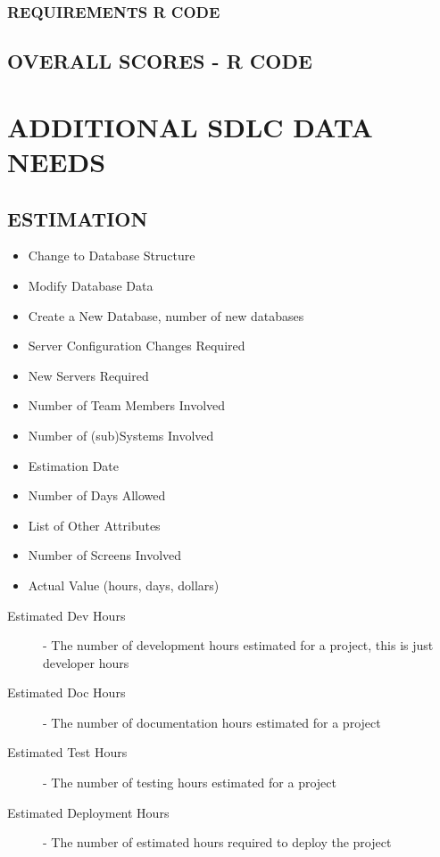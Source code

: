 \documentclass[SDSUThesis.tex]{subfiles}
\begin{document}
        \subsubsection{REQUIREMENTS R CODE}
        
        
        
    \subsection{OVERALL SCORES - R CODE}
        
        
    


\section{ADDITIONAL SDLC DATA NEEDS}

    \subsection{ESTIMATION}
    
    \begin{itemize}
    \item Change to Database Structure  
    \item Modify Database Data    
    \item Create a New Database, number of new databases  
    \item Server Configuration Changes Required   
    \item New Servers Required   
    \item Number of Team Members Involved  
    \item Number of (sub)Systems Involved  
    \item Estimation Date
    \item Number of Days Allowed
    \item List of Other Attributes
    \item Number of Screens Involved 
    \item Actual Value (hours, days, dollars) 
    \end{itemize}
    
    
    \begin{description}
        \item[Estimated Dev Hours] - 
            The number of development hours estimated for a 
            project, this is just developer hours
        \item[Estimated Doc Hours] - 
            The number of documentation hours estimated for a project
        \item[Estimated Test Hours] - 
            The number of testing hours estimated for a project
        \item[Estimated Deployment Hours] - 
            The number of estimated hours required to 
            deploy the project
    \end{description}
    
\end{document}
